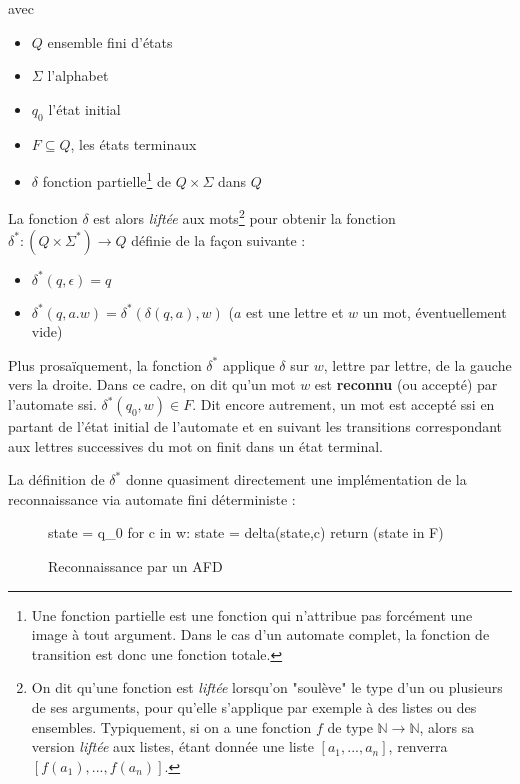 avec

\begin{itemize}
\item[] $Q$ ensemble fini d'états
\item[] $\Sigma$ l'alphabet
\item[] $q_0$ l'état initial
\item[] $F \subseteq Q$, les états terminaux
\item[] $\delta$ fonction partielle\footnote{Une fonction partielle est une fonction qui n'attribue pas forcément une image à tout argument. Dans le cas d'un automate complet, la fonction de transition est donc une fonction totale.} de $Q \times \Sigma$ dans $Q$ 
\end{itemize}

La fonction $\delta$ est alors \textit{liftée} aux mots\footnote{On dit qu'une fonction est \textit{liftée} lorsqu'on "soulève" le type d'un ou plusieurs de ses arguments, pour qu'elle s'applique par exemple à des listes ou des ensembles. Typiquement, si on a une fonction $f$ de type $\mathbb{N} \rightarrow \mathbb{N}$, alors sa version \textit{liftée} aux listes, étant donnée une liste $[a_1,...,a_n]$, renverra $[f(a_1),...,f(a_n)]$.} pour obtenir la fonction $\delta^* : (Q \times \Sigma^*) \rightarrow Q$ définie de la façon suivante :

\begin{itemize}
\item $\delta^*(q,\epsilon) = q$
\item $\delta^*(q,a.w) = \delta^*(\delta(q,a),w)$ ($a$ est une lettre et $w$ un mot, éventuellement vide)
\end{itemize}

Plus prosaïquement, la fonction $\delta^*$ applique $\delta$ sur $w$, lettre par lettre, de la gauche vers la droite. Dans ce cadre, on dit qu'un mot $w$ est \textbf{reconnu} (ou accepté) par l'automate ssi. $\delta^*(q_0,w) \in F$. Dit encore autrement, un mot est accepté ssi en partant de l'état initial de l'automate et en suivant les transitions correspondant aux lettres successives du mot on finit dans un état terminal. 

La définition de $\delta^*$ donne quasiment directement une implémentation de la reconnaissance via automate fini déterministe :
\begin{figure}[!ht]
\begin{python}
state = q_0
for c in w:
    state = delta(state,c)
return (state in F)
\end{python}
\caption{Reconnaissance par un AFD}
\label{afdrec}
\end{figure}

